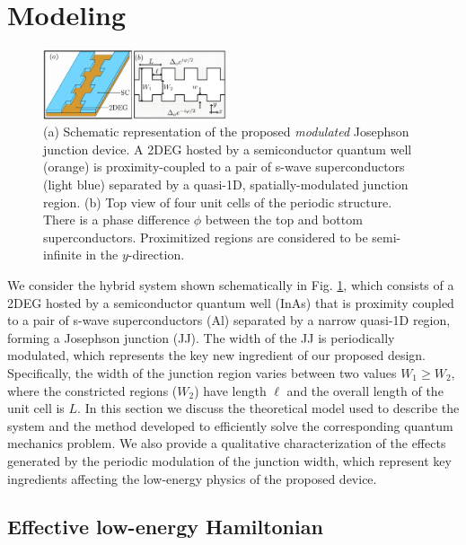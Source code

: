 \documentclass[twocolumn,aps,prb,nofootinbib]{revtex4-2}
\begin{document}
\section{Modeling} \label{Model}

\begin{figure}[t]
\begin{center}
\includegraphics[width=0.48\textwidth]{Fig1_2.pdf}
\end{center}
\vspace{-2mm}
\caption{(a) Schematic representation of the proposed \textit{modulated} Josephson junction device. A 2DEG hosted by a semiconductor quantum well (orange) is proximity-coupled to a pair of s-wave superconductors (light blue) separated by a quasi-1D, spatially-modulated junction region. (b) Top view of four unit cells of the periodic structure. There is a phase difference $\phi$ between the top and bottom superconductors. Proximitized regions are considered to be semi-infinite in the $y$-direction.}
\label{FIG1}
\vspace{-1mm}
\end{figure}

We consider the hybrid system shown schematically in Fig. \ref{FIG1}, which consists of a 2DEG hosted by a semiconductor quantum well (InAs) that is proximity coupled to a pair of s-wave superconductors (Al) separated by a narrow quasi-1D region, forming a Josephson junction (JJ). The width of the JJ is periodically modulated, which represents the key new ingredient of our proposed design. Specifically, the width of the junction region varies between two values $W_1 \geq W_2$, where the constricted regions ($W_2$) have length $\ell$ and the overall length of the unit cell is $L$. In this section we discuss the theoretical model used to describe the system and the method developed to efficiently solve the corresponding quantum mechanics problem. We also provide a qualitative characterization of the effects generated by the periodic modulation of the junction width, which represent key ingredients affecting the low-energy physics of the proposed device.

\subsection{Effective low-energy Hamiltonian}
\end{document}

